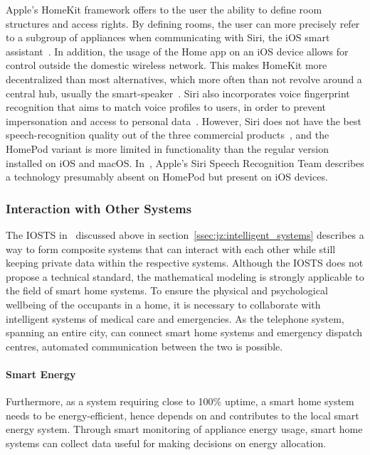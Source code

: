 \documentclass[letterpaper, twocolumn, 10pt, conference]{IEEEtran}
\begin{document}
Apple's HomeKit framework offers to the user the ability to define room structures and access rights. By defining rooms, the user can more precisely refer to a subgroup of appliances when communicating with Siri, the iOS smart assistant~\cite{ritchie2014homekit, wollerton2015control}. In addition, the usage of the Home app on an iOS device allows for control outside the domestic wireless network. This makes HomeKit more decentralized than most alternatives, which more often than not revolve around a central hub, usually the smart-speaker~\cite{crist2018what}. 
Siri also incorporates voice fingerprint recognition that aims to match voice profiles to users, in order to prevent impersonation and access to personal data~\cite{siri2018personalized}. However, Siri does not have the best speech-recognition quality out of the three commercial products~\cite{wollerton2018siri}, and the HomePod variant is more limited in functionality than the regular version installed on iOS and macOS. In~\cite{siri2018finding}, Apple's Siri Speech Recognition Team describes a technology presumably absent on HomePod but present on iOS devices.


\subsubsection{Interaction with Other Systems}
\label{sssec:zcy:smart_home:interaction}

The IOSTS in~\cite{sartor:tel-00748676} discussed above in section~\ref{ssec:jz:intelligent_systems} describes a way to form composite systems that can interact with each other while still keeping private data within the respective systems. Although the IOSTS does not propose a technical standard, the mathematical modeling is strongly applicable to the field of smart home systems. To ensure the physical and psychological wellbeing of the occupants in a home, it is necessary to collaborate with intelligent systems of medical care and emergencies. As the telephone system, spanning an entire city, can connect smart home systems and emergency dispatch centres, automated communication between the two is possible.

\paragraph{Smart Energy}




Furthermore, as a system requiring close to 100\% uptime, a smart home system needs to be energy-efficient, hence depends on and contributes to the local smart energy system. Through smart monitoring of appliance energy usage, smart home systems can collect data useful for making decisions on energy allocation.
\end{document}
